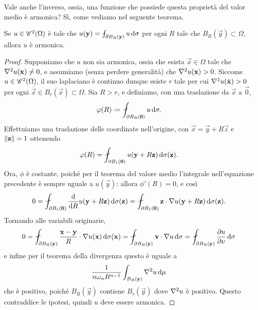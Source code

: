 Vale anche l'inverso, ossia, una funzione che possiede questa proprietà del valor medio è armonica?
S\`i, come vediamo nel seguente teorema.
\begin{teorema} \label{t:valor-medio-armonicità}
    Se $u\in\cont[2]{\Omega}$ è tale che $u(\vec y)=\avint_{\boundary B_R(\vec y)} u\,\dd\sigma$ per ogni $R$ tale che $B_R(\vec y)\subset\Omega$, allora $u$ è armonica.
\end{teorema}
\begin{proof}
    Supponiamo che $u$ non sia armonica, ossia che esista $\vec x\in\Omega$ tale che $\lap u(\vec x)\ne 0$, e assumiamo (senza perdere generalità) che $\lap u(\vec x)>0$.
    Siccome $u\in\cont[2]{\Omega}$, il suo laplaciano è continuo dunque esiste $r$ tale per cui $\lap u(\bar{\vec x})>0$ per ogni $\bar{\vec x}\in B_r(\vec x)\subset\Omega$.
    Sia $R>r$, e definiamo, con una traslazione da $\vec x$ a $\vec 0$,
    \begin{equation}
        \phi(R)\defeq\avint_{\boundary B_R(\vec 0)} u\,\dd\sigma.
    \end{equation}
    Effettuiamo una traslazione delle coordinate nell'origine, con $\vec x=\vec y+R\vec z$ e $\norm{\vec z}=1$ ottenendo
    \begin{equation}
        \phi(R)=\avint_{\boundary B_1(\vec 0)}u(\vec y+R\vec z)\,\dd\sigma(\vec z).
    \end{equation}
    Ora, $\phi$ è costante, poich\'e per il teorema del valore medio l'integrale nell'equazione precedente è sempre uguale a $u(\vec y)$: allora $\phi'(R)=0$, e cos\`i
    \begin{equation}
        0=
        \avint_{\boundary B_1(\vec 0)} \drv{}{R}u(\vec y+R\vec z)\,\dd\sigma(\vec z)=
        \avint_{\boundary B_1(\vec 0)} \scalar{\vec z}{\grad u(\vec y+R\vec z)}\,\dd\sigma(\vec z).
    \end{equation}
    Tornando alle variabili originarie,
    \begin{equation}
        0=
        \avint_{\boundary B_R(\vec y)} \scalar{\frac{\vec x-\vec y}{R}}{\grad u(\vec x)}\,\dd\sigma(\vec x)=
        \avint_{\boundary B_R(\vec y)} \scalar{\vnu}{\grad u}\,\dd\sigma=
        \avint_{\boundary B_R(\vec y)} \drp{u}{\nu}\,\dd\sigma
    \end{equation}
    e infine per il teorema della divergenza questo è uguale a
    \begin{equation}
        \frac1{n\omega_n R^{n-1}}\int_{B_R(\vec y)} \lap u\,\dd\mu
    \end{equation}
    che è positivo, poich\'e $B_R(\vec y)$ contiene $B_r(\vec y)$ dove $\lap u$ è positivo.
    Questo contraddice le ipotesi, quindi $u$ deve essere armonica.
\end{proof}

